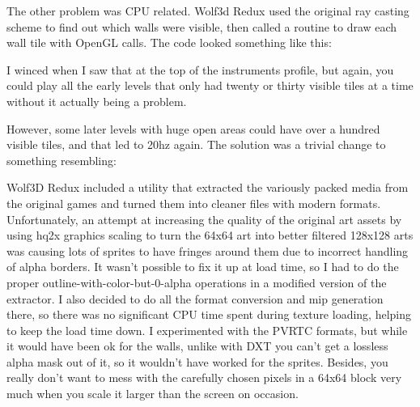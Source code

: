 \documentclass[book.tex]{subfiles}
\begin{document}
The other problem was CPU related.  Wolf3d Redux used the original ray casting scheme to find out which walls were visible, then called a routine to draw each wall tile with OpenGL calls.  The code looked something like this:\\
\par
\begin{minipage}{\textwidth}

\end{minipage}
\par

I winced when I saw that at the top of the instruments profile, but again, you could play all the early levels that only had twenty or thirty visible tiles at a time without it actually being a problem. \\
\par

However, some later levels with huge open areas could have over a hundred visible tiles, and that led to 20hz again.  The solution was a trivial change to something resembling:\\
\par

\begin{minipage}{\textwidth}

\end{minipage}
\par

Wolf3D Redux included a utility that extracted the variously packed media from the original games and turned them into cleaner files with modern formats.  Unfortunately, an attempt at increasing the quality of the original art assets by using hq2x graphics scaling to turn the 64x64 art into better filtered 128x128 arts was causing lots of sprites to have fringes around them due to incorrect handling of alpha borders.  It wasn't possible to fix it up at load time, so I had to do the proper outline-with-color-but-0-alpha operations in a modified version of the extractor.  I also decided to do all the format conversion and mip generation there, so there was no significant CPU time spent during texture loading, helping to keep the load time down.  I experimented with the PVRTC formats, but while it would have been ok for the walls, unlike with DXT you can't get a lossless alpha mask out of it, so it wouldn't have worked for the sprites.  Besides, you really don't want to mess with the carefully chosen pixels in a 64x64 block very much when you scale it larger than the screen on occasion.\\
\par
\end{document}
